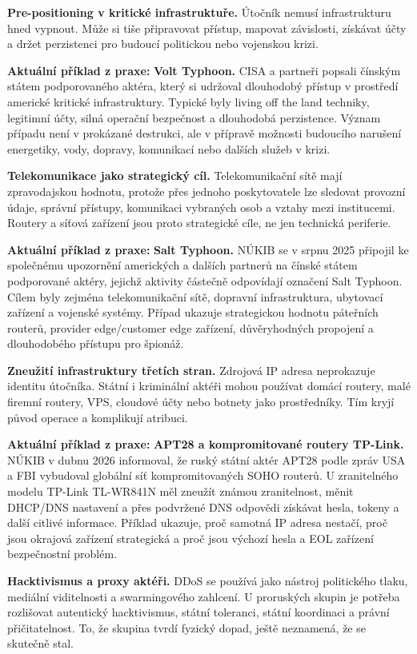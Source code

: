 \documentclass[11pt,a4paper]{article}
\newcommand{\aktualni}[1]{\begin{tcolorbox}[breakable,enhanced,colback=green!10,colframe=green!35!black,boxrule=0pt,arc=1mm,left=5pt,right=5pt,top=5pt,bottom=5pt,before skip=6pt,after skip=6pt]\textbf{Aktuální příklad z praxe:} #1\end{tcolorbox}}
\begin{document}
\textbf{Pre-positioning v kritické infrastruktuře.} Útočník nemusí infrastrukturu hned vypnout. Může si tiše připravovat přístup, mapovat závislosti, získávat účty a držet perzistenci pro budoucí politickou nebo vojenskou krizi.

\aktualni{\textbf{Volt Typhoon.} CISA a partneři popsali čínským státem podporovaného aktéra, který si udržoval dlouhodobý přístup v prostředí americké kritické infrastruktury. Typické byly living off the land techniky, legitimní účty, silná operační bezpečnost a dlouhodobá perzistence. Význam případu není v prokázané destrukci, ale v přípravě možnosti budoucího narušení energetiky, vody, dopravy, komunikací nebo dalších služeb v krizi.}

\textbf{Telekomunikace jako strategický cíl.} Telekomunikační sítě mají zpravodajskou hodnotu, protože přes jednoho poskytovatele lze sledovat provozní údaje, správní přístupy, komunikaci vybraných osob a vztahy mezi institucemi. Routery a síťová zařízení jsou proto strategické cíle, ne jen technická periferie.

\aktualni{\textbf{Salt Typhoon.} NÚKIB se v srpnu 2025 připojil ke společnému upozornění amerických a dalších partnerů na čínské státem podporované aktéry, jejichž aktivity částečně odpovídají označení Salt Typhoon. Cílem byly zejména telekomunikační sítě, dopravní infrastruktura, ubytovací zařízení a vojenské systémy. Případ ukazuje strategickou hodnotu páteřních routerů, provider edge/customer edge zařízení, důvěryhodných propojení a dlouhodobého přístupu pro špionáž.}

\textbf{Zneužití infrastruktury třetích stran.} Zdrojová IP adresa neprokazuje identitu útočníka. Státní i kriminální aktéři mohou používat domácí routery, malé firemní routery, VPS, cloudové účty nebo botnety jako prostředníky. Tím kryjí původ operace a komplikují atribuci.

\aktualni{\textbf{APT28 a kompromitované routery TP-Link.} NÚKIB v dubnu 2026 informoval, že ruský státní aktér APT28 podle zpráv USA a FBI vybudoval globální síť kompromitovaných SOHO routerů. U zranitelného modelu TP-Link TL-WR841N měl zneužít známou zranitelnost, měnit DHCP/DNS nastavení a přes podvržené DNS odpovědi získávat hesla, tokeny a další citlivé informace. Příklad ukazuje, proč samotná IP adresa nestačí, proč jsou okrajová zařízení strategická a proč jsou výchozí hesla a EOL zařízení bezpečnostní problém.}

\textbf{Hacktivismus a proxy aktéři.} DDoS se používá jako nástroj politického tlaku, mediální viditelnosti a swarmingového zahlcení. U proruských skupin je potřeba rozlišovat autentický hacktivismus, státní toleranci, státní koordinaci a právní přičitatelnost. To, že skupina tvrdí fyzický dopad, ještě neznamená, že se skutečně stal.
\end{document}
